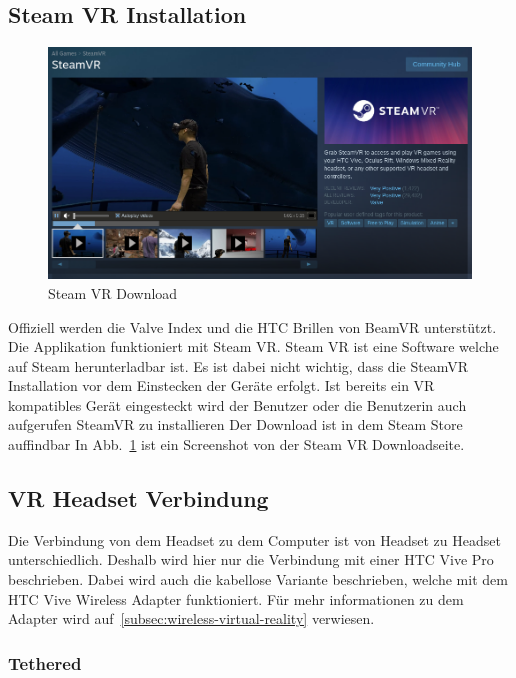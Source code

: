 \subsection{Steam VR Installation}

\begin{figure}
    \centering
    \includegraphics[scale=0.4]{pics/steam-vr-in-store}
    \caption{Steam VR Download}
    \label{fig:steam-vr-in-store}
\end{figure}

Offiziell werden die Valve Index und die HTC Brillen von BeamVR unterstützt.
Die Applikation funktioniert mit Steam VR.
Steam VR ist eine Software welche auf Steam herunterladbar ist.
Es ist dabei nicht wichtig, dass die SteamVR Installation vor dem Einstecken der Geräte erfolgt.
Ist bereits ein VR kompatibles Gerät eingesteckt wird der Benutzer oder die Benutzerin auch aufgerufen SteamVR zu installieren
Der Download ist in dem Steam Store auffindbar
In Abb.~\ref{fig:steam-vr-in-store} ist ein Screenshot von der Steam VR Downloadseite.

\subsection{VR Headset Verbindung}

Die Verbindung von dem Headset zu dem Computer ist von Headset zu Headset unterschiedlich.
Deshalb wird hier nur die Verbindung mit einer HTC Vive Pro beschrieben.
Dabei wird auch die kabellose Variante beschrieben, welche mit dem HTC Vive Wireless Adapter funktioniert.
Für mehr informationen zu dem Adapter wird auf~\ref{subsec:wireless-virtual-reality} verwiesen.

\subsubsection{Tethered}

